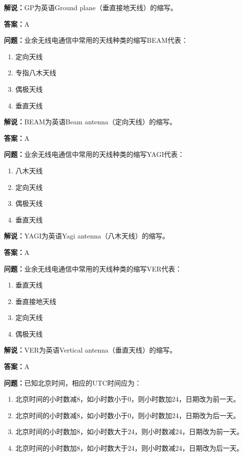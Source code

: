 \documentclass[UTF8]{ctexbook}
\begin{document}
\textbf{解说：}GP为英语Ground plane（垂直接地天线）的缩写。

\textbf{答案：}A

\textbf{问题：}业余无线电通信中常用的天线种类的缩写BEAM代表：

\begin{enumerate}[label=\Alph*), leftmargin=3em]
  \item 定向天线
  \item 专指八木天线
  \item 偶极天线
  \item 垂直天线
\end{enumerate}

\textbf{解说：}BEAM为英语Beam antenna（定向天线）的缩写。

\textbf{答案：}A

\textbf{问题：}业余无线电通信中常用的天线种类的缩写YAGI代表：

\begin{enumerate}[label=\Alph*), leftmargin=3em]
  \item 八木天线
  \item 定向天线
  \item 偶极天线
  \item 垂直天线
\end{enumerate}

\textbf{解说：}YAGI为英语Yagi antenna（八木天线）的缩写。

\textbf{答案：}A

\textbf{问题：}业余无线电通信中常用的天线种类的缩写VER代表：

\begin{enumerate}[label=\Alph*), leftmargin=3em]
  \item 垂直天线
  \item 垂直接地天线
  \item 定向天线
  \item 偶极天线
\end{enumerate}

\textbf{解说：}VER为英语Vertical antenna（垂直天线）的缩写。

\textbf{答案：}A

\textbf{问题：}已知北京时间，相应的UTC时间应为：

\begin{enumerate}[label=\Alph*), leftmargin=3em]
  \item 北京时间的小时数减8，如小时数小于0，则小时数加24，日期改为前一天。
  \item 北京时间的小时数减8，如小时数小于0，则小时数加24，日期改为后一天。
  \item 北京时间的小时数加8，如小时数大于24，则小时数减24，日期改为前一天。
  \item 北京时间的小时数加8，如小时数大于24，则小时数减24，日期改为后一天。
\end{enumerate}
\end{document}
